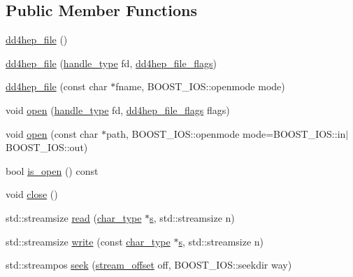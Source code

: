 \subsection*{Public Member Functions}
\begin{DoxyCompactItemize}
\item 
\hyperlink{class_d_d4hep_1_1dd4hep__file_ac14f4f89341ab662c41c0b1de784c458}{dd4hep\+\_\+file} ()
\item 
\hyperlink{class_d_d4hep_1_1dd4hep__file_a171ba6ea4aa627da95bfd8bb7d8aa7a2}{dd4hep\+\_\+file} (\hyperlink{class_d_d4hep_1_1dd4hep__file_a4d79f8d433cd7831ff818691424cd6fc}{handle\+\_\+type} fd, \hyperlink{namespace_d_d4hep_a31d19f9b0ce567067d2897fbda1761e5}{dd4hep\+\_\+file\+\_\+flags})
\item 
\hyperlink{class_d_d4hep_1_1dd4hep__file_a7d25851ca4633fca12a3d23ec2eb4fe1}{dd4hep\+\_\+file} (const char $\ast$fname, B\+O\+O\+S\+T\+\_\+\+I\+O\+S\+::openmode mode)
\item 
void \hyperlink{class_d_d4hep_1_1dd4hep__file_a5f7da6679da9dbc31f37c85e51d7dd94}{open} (\hyperlink{class_d_d4hep_1_1dd4hep__file_a4d79f8d433cd7831ff818691424cd6fc}{handle\+\_\+type} fd, \hyperlink{namespace_d_d4hep_a31d19f9b0ce567067d2897fbda1761e5}{dd4hep\+\_\+file\+\_\+flags} flags)
\item 
void \hyperlink{class_d_d4hep_1_1dd4hep__file_a44e65364ed22ce152f237541e0391dcc}{open} (const char $\ast$path, B\+O\+O\+S\+T\+\_\+\+I\+O\+S\+::openmode mode=B\+O\+O\+S\+T\+\_\+\+I\+O\+S\+::in$\vert$B\+O\+O\+S\+T\+\_\+\+I\+O\+S\+::out)
\item 
bool \hyperlink{class_d_d4hep_1_1dd4hep__file_a9fdd990cc635328ed3987f16cc0a07c1}{is\+\_\+open} () const
\item 
void \hyperlink{class_d_d4hep_1_1dd4hep__file_afdabf56b0a0af86b2199e075ab1b2499}{close} ()
\item 
std\+::streamsize \hyperlink{class_d_d4hep_1_1dd4hep__file_a3becd552128a6306644b5ff9bd19c493}{read} (\hyperlink{class_d_d4hep_1_1dd4hep__file_aef4242f7f2fe15a59f7bf7a8f6ba24d5}{char\+\_\+type} $\ast$\hyperlink{_volumes_8cpp_a17ca6bfc8040d695d3cada22a4763d40}{s}, std\+::streamsize n)
\item 
std\+::streamsize \hyperlink{class_d_d4hep_1_1dd4hep__file_a33bb5fb24cdaf006ff9143d0d03f9bd3}{write} (const \hyperlink{class_d_d4hep_1_1dd4hep__file_aef4242f7f2fe15a59f7bf7a8f6ba24d5}{char\+\_\+type} $\ast$\hyperlink{_volumes_8cpp_a17ca6bfc8040d695d3cada22a4763d40}{s}, std\+::streamsize n)
\item 
std\+::streampos \hyperlink{class_d_d4hep_1_1dd4hep__file_a202c036e68f217e7a902819eb83ec2f3}{seek} (\hyperlink{class_d_d4hep_1_1dd4hep__file_a28e1531542193871075e8b7f47818113}{stream\+\_\+offset} off, B\+O\+O\+S\+T\+\_\+\+I\+O\+S\+::seekdir way)

\end{DoxyCompactItemize}
